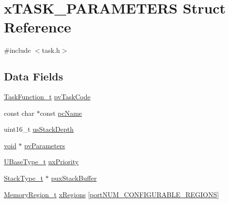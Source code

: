 \hypertarget{structxTASK__PARAMETERS}{\section{x\-T\-A\-S\-K\-\_\-\-P\-A\-R\-A\-M\-E\-T\-E\-R\-S Struct Reference}
\label{structxTASK__PARAMETERS}
}


{\ttfamily \#include $<$task.\-h$>$}

\subsection*{Data Fields}
\begin{DoxyCompactItemize}
\item 
\hyperlink{projdefs_8h_a24177544ba9c507a9429d6d5761eb487}{Task\-Function\-\_\-t} \hyperlink{structxTASK__PARAMETERS_a7527993402054565cda38251c8922880}{pv\-Task\-Code}
\item 
const char $\ast$const \hyperlink{structxTASK__PARAMETERS_a7b3e5583acf9de8bacac572a42246459}{pc\-Name}
\item 
uint16\-\_\-t \hyperlink{structxTASK__PARAMETERS_aa07bfb2214d78ba7a30592fa7b75af18}{us\-Stack\-Depth}
\item 
\hyperlink{Paradigm_2Tern__EE_2small_2portmacro_8h_a14d32f8130d3c0b212cfc751730b5b49}{void} $\ast$ \hyperlink{structxTASK__PARAMETERS_accbb9f4de75b5b5be750198b52390c7f}{pv\-Parameters}
\item 
\hyperlink{Flsh186_2prtmacro_8h_a8e88a5e44a5243b3d1c29af17fd6b5bd}{U\-Base\-Type\-\_\-t} \hyperlink{structxTASK__PARAMETERS_aa1aff14035db645e2bdcc85b3cdc9bab}{ux\-Priority}
\item 
\hyperlink{Flsh186_2prtmacro_8h_a84e9a8ba132feed0b2401c1f4e2ac63c}{Stack\-Type\-\_\-t} $\ast$ \hyperlink{structxTASK__PARAMETERS_a946c525d3765369780538f9bc3f3586d}{pux\-Stack\-Buffer}
\item 
\hyperlink{task_8h_af609504de4d78ff6f71477ae47c66e51}{Memory\-Region\-\_\-t} \hyperlink{structxTASK__PARAMETERS_ae8b97c6b7a344bf09b066b0844844d66}{x\-Regions} \mbox{[}\hyperlink{RVDS_2ARM__CM4__MPU_2portmacro_8h_aca7e1a8a568a38b74cc9db10c8efebda}{port\-N\-U\-M\-\_\-\-C\-O\-N\-F\-I\-G\-U\-R\-A\-B\-L\-E\-\_\-\-R\-E\-G\-I\-O\-N\-S}\mbox{]}
\end{DoxyCompactItemize}


